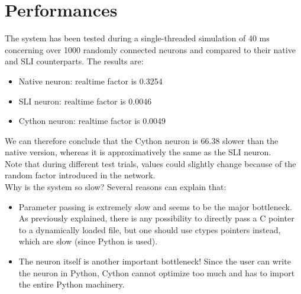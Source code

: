 \documentclass{article}
\begin{document}
\section{Performances}
The system has been tested during a single-threaded simulation of 40 ms concerning over 1000 randomly connected neurons and compared to their native and SLI counterparts. The results are:
\begin{itemize}
\item Native neuron: realtime factor is 0.3254
\item SLI neuron: realtime factor is 0.0046
\item Cython neuron: realtime factor is 0.0049
\end{itemize}
We can therefore conclude that the Cython neuron is 66.38 slower than the native version, whereas it is approximatively the same as the SLI neuron.\\
Note that during different test trials, values could slightly change because of the random factor introduced in the network.\\
Why is the system so slow? Several reasons can explain that:
\begin{itemize}
\item Parameter passing is extremely slow and seems to be the major bottleneck. As previously explained, there is any possibility to directly pass a C pointer to a dynamically loaded file, but one should use ctypes pointers instead, which are slow (since Python is used).
\item The neuron itself is another important bottleneck! Since the user can write the neuron in Python, Cython cannot optimize too much and has to import the entire Python machinery.
\end{itemize}
\end{document}
